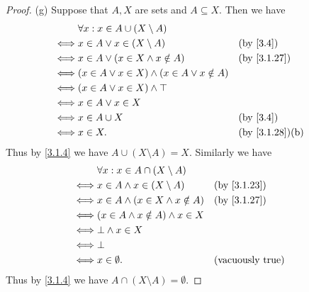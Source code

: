 \begin{proof}{(g)}
	Suppose that \(A, X\) are sets and \(A \subseteq X\).
	Then we have
	\begin{align*}
		     & \forall x : x \in A \cup (X \setminus A)                                                 \\
		\iff & x \in A \lor x \in (X \setminus A)                     &  & \by{3.4}                     \\
		\iff & x \in A \lor (x \in X \land x \notin A)                &  & \by{3.1.27}                  \\
		\iff & (x \in A \lor x \in X) \land (x \in A \lor x \notin A)                                   \\
		\iff & (x \in A \lor x \in X) \land \top                                                        \\
		\iff & x \in A \lor x \in X                                                                     \\
		\iff & x \in A \cup X                                         &  & \by{3.4}                     \\
		\iff & x \in X.                                               &  & \text{(by \cref{3.1.28})(b)}
	\end{align*}
	Thus by \cref{3.1.4} we have \(A \cup (X \setminus A) = X\).
	Similarly we have
	\begin{align*}
		     & \forall x : x \in A \cap (X \setminus A)                              \\
		\iff & x \in A \land x \in (X \setminus A)      &  & \by{3.1.23}             \\
		\iff & x \in A \land (x \in X \land x \notin A) &  & \by{3.1.27}             \\
		\iff & (x \in A \land x \notin A) \land x \in X                              \\
		\iff & \bot \land x \in X                                                    \\
		\iff & \bot                                                                  \\
		\iff & x \in \emptyset.                         &  & \text{(vacuously true)}
	\end{align*}
	Thus by \cref{3.1.4} we have \(A \cap (X \setminus A) = \emptyset\).
\end{proof}

